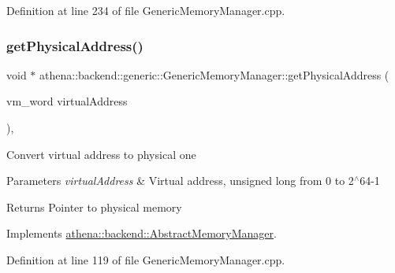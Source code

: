 Definition at line 234 of file Generic\+Memory\+Manager.\+cpp.

\mbox{\label{classathena_1_1backend_1_1generic_1_1_generic_memory_manager_a7f3dacb56bd95b837910441d0aef1dd8}} 
\subsubsection{\texorpdfstring{get\+Physical\+Address()}{getPhysicalAddress()}}
{\footnotesize\ttfamily void $\ast$ athena\+::backend\+::generic\+::\+Generic\+Memory\+Manager\+::get\+Physical\+Address (\begin{DoxyParamCaption}\item[{vm\+\_\+word}]{virtual\+Address }\end{DoxyParamCaption})\hspace{0.3cm}{\ttfamily [override]}, {\ttfamily [virtual]}}

Convert virtual address to physical one 
\begin{DoxyParams}{Parameters}
{\em virtual\+Address} & Virtual address, unsigned long from 0 to 2$^\wedge$64-\/1 \\
\hline
\end{DoxyParams}
\begin{DoxyReturn}{Returns}
Pointer to physical memory 
\end{DoxyReturn}


Implements \mbox{\hyperlink{classathena_1_1backend_1_1_abstract_memory_manager_ad441d7a2281f5f2b2627272d136f72b8}{athena\+::backend\+::\+Abstract\+Memory\+Manager}}.



Definition at line 119 of file Generic\+Memory\+Manager.\+cpp.

\mbox{\label{classathena_1_1backend_1_1generic_1_1_generic_memory_manager_a0e39c872b8b41d5239884322988d314d}} 

